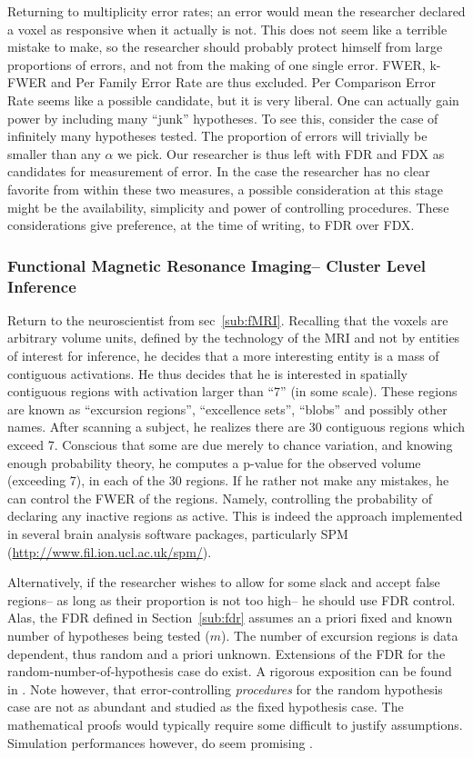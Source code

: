 \documentclass[review,12pt]{article}
\theoremstyle{definition}
\begin{document}
Returning to multiplicity error rates; an error would mean the researcher declared a voxel as responsive when it actually is not. This does not seem like a terrible mistake to make, so the researcher should probably protect himself from large proportions of errors, and not from the making of one single error. FWER, k-FWER and Per Family Error Rate are thus excluded. Per Comparison Error Rate seems like a possible candidate, but it is very liberal. One can actually gain power by including many ``junk'' hypotheses. To see this, consider the case of infinitely many hypotheses tested. The proportion of errors will trivially be smaller than any $\alpha$ we pick. Our researcher is thus left with FDR and FDX as candidates for measurement of error. 
In the case the researcher has no clear favorite from within these two measures, a possible consideration at this stage might be the availability, simplicity and power of controlling procedures. These considerations give preference, at the time of writing, to FDR over FDX. 


\subsubsection{Functional Magnetic Resonance Imaging-- Cluster Level Inference}

Return to the neuroscientist from sec~\ref{sub:fMRI}. Recalling that the voxels are arbitrary volume units, defined by the technology of the MRI and not by entities of interest for inference, he decides that a more interesting entity is a mass of contiguous activations. He thus decides that he is interested in spatially contiguous regions with activation larger than ``7'' (in some scale). These regions are known as ``excursion regions'', ``excellence sets'', ``blobs'' and possibly other names. 
After scanning a subject, he realizes there are 30 contiguous regions which exceed 7. Conscious that some are  due merely to chance variation, and knowing enough probability theory, he computes a p-value for the observed volume (exceeding 7), in each of the 30 regions. If he rather not make any mistakes, he can control the FWER of the regions. Namely, controlling the probability of declaring any inactive regions as active. This is indeed the approach implemented in several brain analysis software packages, particularly SPM (\url{http://www.fil.ion.ucl.ac.uk/spm/}).

Alternatively, if the researcher wishes to allow for some slack and accept false regions-- as long as their proportion is not too high-- he should use FDR control. Alas, the FDR defined in Section~\ref{sub:fdr} assumes an a priori fixed and known number of hypotheses being tested ($m$). The number of excursion regions is data dependent, thus random and a priori unknown. Extensions of the FDR for the random-number-of-hypothesis case do exist. A rigorous exposition can be found in  \citet{siegmund_false_2011}. Note however, that error-controlling \emph{procedures} for the random hypothesis case are not as abundant and studied as the fixed hypothesis case. The mathematical proofs would typically require some difficult to justify assumptions. Simulation performances however, do seem promising \citep{chumbley_false_2009,chumbley_topological_2010}.
\end{document}
